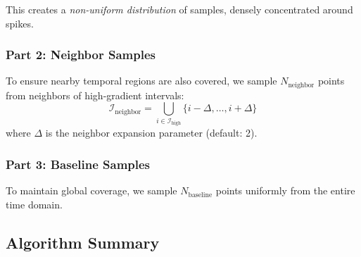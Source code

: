 \documentclass[11pt,a4paper]{article}
\begin{document}
This creates a \textit{non-uniform distribution} of samples, densely concentrated around spikes.

\subsubsection{Part 2: Neighbor Samples}

To ensure nearby temporal regions are also covered, we sample $N_{\text{neighbor}}$ points from neighbors of high-gradient intervals:
\begin{equation}
    \mathcal{I}_{\text{neighbor}} = \bigcup_{i \in \mathcal{I}_{\text{high}}} \{i - \Delta, \dots, i + \Delta\}
\end{equation}
where $\Delta$ is the neighbor expansion parameter (default: 2).

\subsubsection{Part 3: Baseline Samples}

To maintain global coverage, we sample $N_{\text{baseline}}$ points uniformly from the entire time domain.

\subsection{Algorithm Summary}
\end{document}
